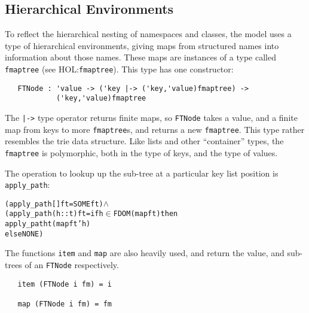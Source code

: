 \documentclass[11pt]{article}
\newcommand{\HOLfile}[1]{HOL:\texttt{#1}}
\begin{document}
\subsection{Hierarchical Environments}
\label{sec:hierarchical-environments}

To reflect the hierarchical nesting of namespaces and classes, the
model uses a type of hierarchical environments, giving maps from
structured names into information about those names.  These maps are
instances of a type called \texttt{fmaptree} (see \HOLfile{fmaptree}).
This type has one constructor:
\begin{verbatim}
   FTNode : 'value -> ('key |-> ('key,'value)fmaptree) ->
            ('key,'value)fmaptree
\end{verbatim}
The \texttt{|->} type operator returns finite maps, so
\texttt{FTNode} takes a value, and a finite map from keys to more
\texttt{fmaptree}s, and returns a new \texttt{fmaptree}.  This type
rather resembles the trie data structure.  Like lists and other
``container'' types, the \texttt{fmaptree} is polymorphic, both in the
type of keys, and the type of values.

The operation to lookup up the sub-tree at a particular key list position
is \texttt{apply_path}:
\begin{alltt}
  (apply_path [] ft = SOME ft) \(\land\)
  (apply_path (h::t) ft = if h \(\in\) FDOM (map ft) then
                             apply_path t (map ft ' h)
                          else NONE)

\end{alltt}

The functions \texttt{item} and \texttt{map} are also heavily used,
and return the value, and sub-trees of an \texttt{FTNode}
respectively.
\begin{verbatim}
   item (FTNode i fm) = i

   map (FTNode i fm) = fm
\end{verbatim}
\end{document}
